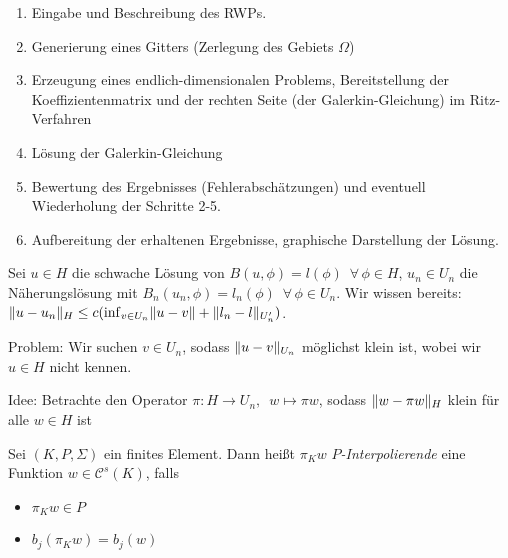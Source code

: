 \documentclass{cheat-sheet}
\newcommand{\Cont}{\mathcal{C}} %
\newcommand{\tss}[1]{\textsubscript{#1}} %
\begin{document}

\begin{enumerate}
  \item Eingabe und Beschreibung des RWPs.
  \item Generierung eines Gitters (Zerlegung des Gebiets $\Omega$)
  \item Erzeugung eines endlich-dimensionalen Problems, \dh{} Bereitstellung der Koeffizientenmatrix und der rechten Seite (der Galerkin-Gleichung) im Ritz-Verfahren
  \item Lösung der Galerkin-Gleichung
  \item Bewertung des Ergebnisses (Fehlerabschätzungen) und eventuell Wiederholung der Schritte 2-5.
  \item Aufbereitung der erhaltenen Ergebnisse, graphische Darstellung der Lösung.
\end{enumerate}






\iffalse
\[
  \text{(VGL)\tss{n}} \quad
  B_n(u_n, \phi) = l_n(\phi) \enspace \forall \, \phi \in U_n
  \quad \text{mit} \quad
  B_n(u_n, \phi) = \Int{\Omega}{}{\D u_n \cdot D \phi}{x}, \enspace
  l_n(\phi) = \Int{\Omega}{}{f(x) \phi(x)}{x}
\]

Sei $T(\Omega) = \Set{(K_i, P(K_i), \Sigma(K_i))}{i = 1, \ldots, N}$ (eine zulässige Triangulierung)
\ldots %
\fi


Sei $u \in H$ die schwache Lösung von $B(u, \phi) = l(\phi) \enspace \forall \, \phi \in H$,
$u_n \in U_n$ die Näherungslösung mit $B_n(u_n, \phi) = l_n(\phi) \enspace \forall \, \phi \in U_n$.
Wir wissen bereits: $\lVert u - u_n\rVert_H \leq c (\inf_{v \in U_n} \lVert u-v\rVert + \lVert l_n - l\rVert_{U_n'})$.

Problem: Wir suchen $v \in U_n$, sodass $\lVert u - v\rVert_{U_n}$ möglichst klein ist, wobei wir $u \in H$ nicht kennen.

Idee: Betrachte den Operator $\pi : H \to U_n, \enspace w \mapsto \pi w$, sodass $\lVert w - \pi w\rVert_H$ klein für alle $w \in H$ ist

\begin{defn}
  Sei $(K, P, \Sigma)$ ein finites Element.
  Dann heißt $\pi_K w$ \emph{$P$-Interpolierende} eine Funktion $w \in \Cont^s(K)$, falls
  \begin{itemize}
    \item $\pi_K w \in P$
    \item $b_j(\pi_K w) = b_j(w)$
  \end{itemize}
\end{defn}
\end{document}
